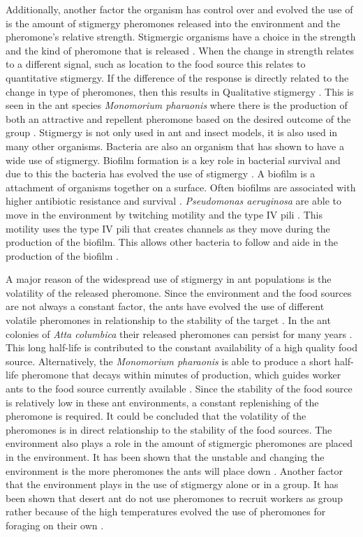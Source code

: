 Additionally, another factor the organism has control over and evolved the use of is the amount of stigmergy pheromones released into the environment and the pheromone’s relative strength.
Stigmergic organisms have a choice in the strength and the kind of pheromone that is released \cite{theraulaz1999brief}.
When the change in strength relates to a different signal, such as location to the food source this relates to quantitative stigmergy.
If the difference of the response is directly related to the change in type of pheromones, then this results in Qualitative stigmergy \cite{heylighen_stigmergy_2016b}.
This is seen in the ant species \textit{Monomorium pharaonis} where there is the production of both an attractive and repellent pheromone based on the desired outcome of the group \cite{jeanson_pheromone_2003}.
Stigmergy is not only used in ant and insect models, it is also used in many other organisms.
Bacteria are also an organism that has shown to have a wide use of stigmergy.
Biofilm formation is a key role in bacterial survival and due to this the bacteria has evolved the use of stigmergy \cite{gloag_bacterial_2015}.
A biofilm is a attachment of organisms together on a surface.
Often biofilms are associated with higher antibiotic resistance and survival \cite{donlan2002biofilms}.
\textit{Pseudomonas aeruginosa} are able to move in the environment by twitching motility and the type IV pili \cite{persat2015type}.
This motility uses the type IV pili that creates channels as they move during the production of the biofilm.
This allows other bacteria to follow and aide in the production of the biofilm \cite{gloag_stigmergy:_2013}.

A major reason of the widespread use of stigmergy in ant populations is the volatility of the released pheromone.
Since the environment and the food sources are not always a constant factor, the ants have evolved the use of different volatile pheromones in relationship to the stability of the target \cite{jeanson_pheromone_2003}.
In the ant colonies of \textit{Atta columbica} their released pheromones can persist for many years \cite{howard_costs_2001}.
This long half-life is contributed to the constant availability of a high quality food source.
Alternatively, the \textit{Monomorium pharaonis} is able to produce a short half-life pheromone that decays within minutes of production, which guides worker ants to the food source currently available \cite{robinson_decay_2008}.
Since the stability of the food source is relatively low in these ant environments, a constant replenishing of the pheromone is required.
It could be concluded that the volatility of the pheromones is in direct relationship to the stability of the food sources.
The environment also plays a role in the amount of stigmergic pheromones are placed in the environment.
It has been shown that the unstable and changing the environment is the more pheromones the ants will place down \cite{czaczkes2015trail}.
Another factor that the environment plays in the use of stigmergy alone or in a group.
It has been shown that desert ant do not use pheromones to recruit workers as group rather because of the high temperatures evolved the use of pheromones for foraging on their own \cite{ruano_high_2000}.

